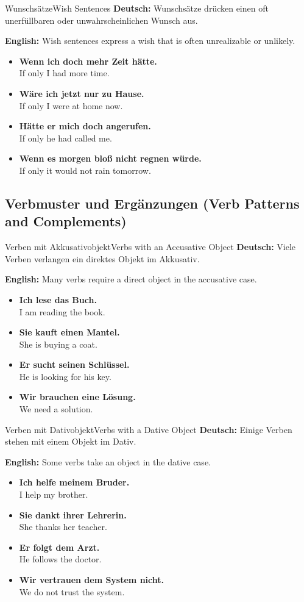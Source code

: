 \documentclass[a4paper,11pt]{article}
\newcommand{\GermanText}[1]{\textbf{Deutsch: }#1\par}
\newcommand{\EnglishText}[1]{{\color{SoftGray}\textbf{English: }#1\par}}
\newcommand{\ExampleItem}[2]{\item \textbf{#1}\\{\color{SoftGray}#2}}
\begin{document}
\begin{grammarentry}{Wunschsätze}{Wish Sentences}
    \GermanText{Wunschsätze drücken einen oft unerfüllbaren oder unwahrscheinlichen Wunsch aus.}
    \EnglishText{Wish sentences express a wish that is often unrealizable or unlikely.}
    \begin{exbox}
        \begin{itemize}
            \ExampleItem{Wenn ich doch mehr Zeit hätte.}{If only I had more time.}
            \ExampleItem{Wäre ich jetzt nur zu Hause.}{If only I were at home now.}
            \ExampleItem{Hätte er mich doch angerufen.}{If only he had called me.}
            \ExampleItem{Wenn es morgen bloß nicht regnen würde.}{If only it would not rain tomorrow.}
        \end{itemize}
    \end{exbox}
\end{grammarentry}

\subsection{Verbmuster und Ergänzungen {\small (Verb Patterns and Complements)}}

\begin{grammarentry}{Verben mit Akkusativobjekt}{Verbs with an Accusative Object}
    \GermanText{Viele Verben verlangen ein direktes Objekt im Akkusativ.}
    \EnglishText{Many verbs require a direct object in the accusative case.}
    \begin{exbox}
        \begin{itemize}
            \ExampleItem{Ich lese das Buch.}{I am reading the book.}
            \ExampleItem{Sie kauft einen Mantel.}{She is buying a coat.}
            \ExampleItem{Er sucht seinen Schlüssel.}{He is looking for his key.}
            \ExampleItem{Wir brauchen eine Lösung.}{We need a solution.}
        \end{itemize}
    \end{exbox}
\end{grammarentry}

\begin{grammarentry}{Verben mit Dativobjekt}{Verbs with a Dative Object}
    \GermanText{Einige Verben stehen mit einem Objekt im Dativ.}
    \EnglishText{Some verbs take an object in the dative case.}
    \begin{exbox}
        \begin{itemize}
            \ExampleItem{Ich helfe meinem Bruder.}{I help my brother.}
            \ExampleItem{Sie dankt ihrer Lehrerin.}{She thanks her teacher.}
            \ExampleItem{Er folgt dem Arzt.}{He follows the doctor.}
            \ExampleItem{Wir vertrauen dem System nicht.}{We do not trust the system.}
        \end{itemize}
    \end{exbox}
\end{grammarentry}
\end{document}
